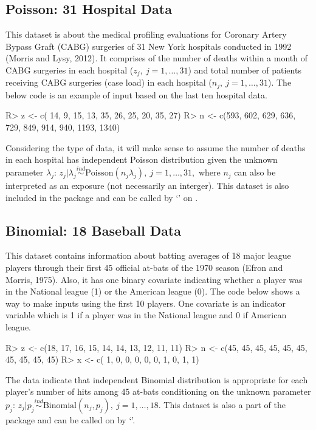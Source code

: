 \documentclass[article]{jss}
\begin{document}
\subsection{Poisson: 31 Hospital Data}
This dataset is about the medical profiling evaluations for Coronary Artery Bypass Graft (CABG) surgeries of 31 New York hospitals conducted in 1992 (Morris and Lysy, 2012). It comprises of the number of deaths within a month of CABG surgeries in each hospital ($z_{j},~j=1, \ldots, 31$) and total number of patients receiving CABG surgeries (case load) in each hospital ($n_{j},~j=1, \ldots, 31$). The below code is an example of input based on the last ten hospital data.
\begin{CodeChunk}
\begin{CodeInput}
R> z <- c( 14,   9,  15,  13,  35,  26,  25,  20,   35,   27)
R> n <- c(593, 602, 629, 636, 729, 849, 914, 940, 1193, 1340)
\end{CodeInput}
\end{CodeChunk}


Considering the type of data, it will make sense to assume the number of deaths in each hospital has independent Poisson distribution given the unknown parameter $\lambda_{j}$: $z_{j}\vert \lambda_{j}\stackrel{ind}{\sim} \textrm{Poisson}(n_{j}\lambda_{j}), ~j=1, \ldots, 31,$ where $n_{j}$ can also be interpreted as an exposure (not necessarily an interger). This dataset is also included in the package and can be called by `' on .

\subsection{Binomial: 18 Baseball Data}
This dataset contains information about batting averages of 18 major league players through their first 45 official at-bats of the 1970 season (Efron and Morris, 1975). Also, it has one binary covariate indicating whether a player was in the National league (1) or the American league (0). The code below shows a way to make inputs using the first 10 players. One covariate is an indicator variable which is 1 if a player was in the National league and 0 if American league.
\begin{CodeChunk}
\begin{CodeInput}
R> z <- c(18, 17, 16, 15, 14, 14, 13, 12, 11, 11)
R> n <- c(45, 45, 45, 45, 45, 45, 45, 45, 45, 45)
R> x <- c( 1,  0,  0,  0,  0,  0,  1,  0,  1,  1) 
\end{CodeInput}
\end{CodeChunk}
The data indicate that independent Binomial distribution is appropriate for each player's number of hits among 45 at-bats conditioning on the unknown parameter $p_{j}$: $z_{j}\vert p_{j}\stackrel{ind}{\sim} \textrm{Binomial}(n_{j}, p_{j}), ~j=1, \ldots, 18$. This dataset is also a part of the package and can be called on  by `'.
\end{document}
